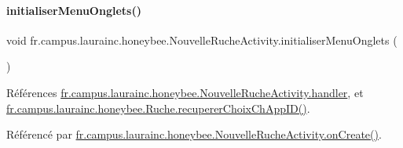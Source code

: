 \mbox{\label{classfr_1_1campus_1_1laurainc_1_1honeybee_1_1_nouvelle_ruche_activity_ad9bdfb01df8d7402b4da9858f263e1fd}} 
\paragraph{\texorpdfstring{initialiser\+Menu\+Onglets()}{initialiserMenuOnglets()}}
{\footnotesize\ttfamily void fr.\+campus.\+laurainc.\+honeybee.\+Nouvelle\+Ruche\+Activity.\+initialiser\+Menu\+Onglets (\begin{DoxyParamCaption}{ }\end{DoxyParamCaption})\hspace{0.3cm}{\ttfamily [private]}}



Références \hyperlink{classfr_1_1campus_1_1laurainc_1_1honeybee_1_1_nouvelle_ruche_activity_a71c7cb93b67cfe6c419c3c6f8504bbc0}{fr.\+campus.\+laurainc.\+honeybee.\+Nouvelle\+Ruche\+Activity.\+handler}, et \hyperlink{classfr_1_1campus_1_1laurainc_1_1honeybee_1_1_ruche_ade5d681bd0a29d84e0d069169b10a38b}{fr.\+campus.\+laurainc.\+honeybee.\+Ruche.\+recuperer\+Choix\+Ch\+App\+I\+D()}.



Référencé par \hyperlink{classfr_1_1campus_1_1laurainc_1_1honeybee_1_1_nouvelle_ruche_activity_ae97fec78fb0a2e1cc4610182bc71ea0d}{fr.\+campus.\+laurainc.\+honeybee.\+Nouvelle\+Ruche\+Activity.\+on\+Create()}.


